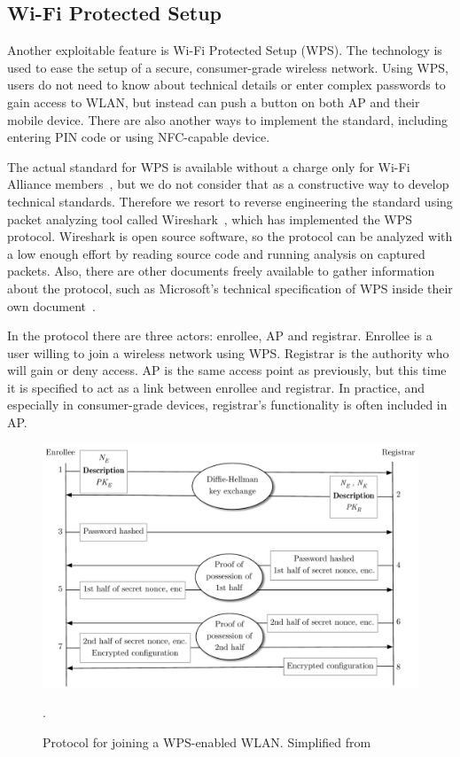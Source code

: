 \documentclass[12pt,a4paper,oneside,pdftex]{report}
\begin{document}
\subsection{Wi-Fi Protected Setup}
\label{sec:wps}

Another exploitable feature is Wi-Fi Protected Setup (WPS). The technology is used to ease the setup of a secure, consumer-grade wireless network. Using WPS, users do not need to know about technical details or enter complex passwords to gain access to WLAN, but instead can push a button on both AP and their mobile device. There are also another ways to implement the standard, including entering PIN code or using NFC-capable device.~\cite{alliance2007wi}

The actual standard for WPS is available without a charge only for Wi-Fi Alliance members~\cite{alliance2007wi}, but we do not consider that as a constructive way to develop technical standards. Therefore we resort to reverse engineering the standard using packet analyzing tool called Wireshark~\cite{wireshark}, which has implemented the WPS protocol. Wireshark is open source software, so the protocol can be analyzed with a low enough effort by reading source code and running analysis on captured packets. Also, there are other documents freely available to gather information about the protocol, such as Microsoft's technical specification of WPS inside their own document~\cite{microsoftWCN}.

In the protocol there are three actors: enrollee, AP and registrar. Enrollee is a user willing to join a wireless network using WPS. Registrar is the authority who will gain or deny access. AP is the same access point as previously, but this time it is specified to act as a link between enrollee and registrar. In practice, and especially in consumer-grade devices, registrar's functionality is often included in AP. 

\begin{figure}
    \includegraphics[width=\textwidth]{images/wps}
    \caption{Protocol for joining a WPS-enabled WLAN. Simplified from~\cite{microsoftWCN}}.
    \label{tab:wps}
\end{figure}
\end{document}
